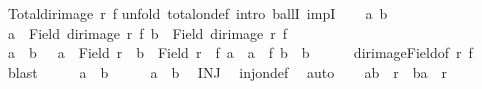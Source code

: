 \begin{isabellebody}
\ {\isachardoublequoteopen}Total{\isacharparenleft}{\kern0pt}dir{\isacharunderscore}{\kern0pt}image\ r\ f{\isacharparenright}{\kern0pt}{\isachardoublequoteclose}\isanewline
%
\isadelimproof
%
\endisadelimproof
%
\isatagproof
{}\isamarkupfalse%
{\isacharparenleft}{\kern0pt}unfold\ total{\isacharunderscore}{\kern0pt}on{\isacharunderscore}{\kern0pt}def{\isacharcomma}{\kern0pt}\ intro\ ballI\ impI{\isacharparenright}{\kern0pt}\isanewline
\ \ \isamarkupfalse%
\ a{\isacharprime}{\kern0pt}\ b{\isacharprime}{\kern0pt}\isanewline
\ \ \isamarkupfalse%
\ {\isachardoublequoteopen}a{\isacharprime}{\kern0pt}\ {\isasymin}\ Field\ {\isacharparenleft}{\kern0pt}dir{\isacharunderscore}{\kern0pt}image\ r\ f{\isacharparenright}{\kern0pt}{\isachardoublequoteclose}\ {\isachardoublequoteopen}b{\isacharprime}{\kern0pt}\ {\isasymin}\ Field\ {\isacharparenleft}{\kern0pt}dir{\isacharunderscore}{\kern0pt}image\ r\ f{\isacharparenright}{\kern0pt}{\isachardoublequoteclose}\isanewline
\ \ \isamarkupfalse%
\ \isamarkupfalse%
\ a\ \ b\ \ {}{\isacharcolon}{\kern0pt}\ {\isachardoublequoteopen}a\ {\isasymin}\ Field\ r\ {\isasymand}\ b\ {\isasymin}\ Field\ r\ {\isasymand}\ f\ a\ {\isacharequal}{\kern0pt}\ a{\isacharprime}{\kern0pt}\ {\isasymand}\ f\ b\ {\isacharequal}{\kern0pt}\ b{\isacharprime}{\kern0pt}{\isachardoublequoteclose}\isanewline
\ \ \ \ \isamarkupfalse%
\ dir{\isacharunderscore}{\kern0pt}image{\isacharunderscore}{\kern0pt}Field{\isacharbrackleft}{\kern0pt}of\ r\ f{\isacharbrackright}{\kern0pt}\ \isamarkupfalse%
\ blast\isanewline
\ \ \isamarkupfalse%
\ \isamarkupfalse%
\ {\isachardoublequoteopen}a{\isacharprime}{\kern0pt}\ {\isasymnoteq}\ b{\isacharprime}{\kern0pt}{\isachardoublequoteclose}\isanewline
\ \ \isamarkupfalse%
\ \isamarkupfalse%
\ {\isachardoublequoteopen}a\ {\isasymnoteq}\ b{\isachardoublequoteclose}\ \isamarkupfalse%
\ INJ\ \isamarkupfalse%
\ inj{\isacharunderscore}{\kern0pt}on{\isacharunderscore}{\kern0pt}def\ \isamarkupfalse%
\ auto\isanewline
\ \ \isamarkupfalse%
\ {\isachardoublequoteopen}{\isacharparenleft}{\kern0pt}a{\isacharcomma}{\kern0pt}b{\isacharparenright}{\kern0pt}\ {\isasymin}\ r\ {\isasymor}\ {\isacharparenleft}{\kern0pt}b{\isacharcomma}{\kern0pt}a{\isacharparenright}{\kern0pt}\ {\isasymin}\ r{\isachardoublequoteclose}\ \isamarkupfalse%

\end{isabellebody}
